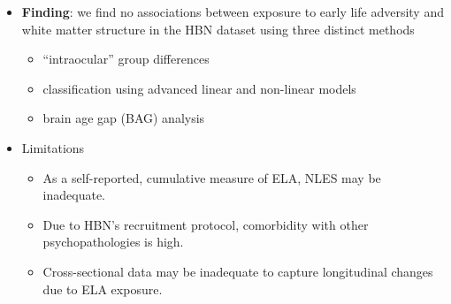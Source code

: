 \documentclass[a0paper,landscape,fontscale=0.385]{baposter}
\begin{document}
\begin{poster}
{\begin{multicols}{2}
\begin{itemize}[nosep, leftmargin=*]
    \item \textbf{Finding}: we find no associations between exposure to early
    life adversity and white matter structure in the HBN dataset using three
    distinct methods
    \begin{itemize}[nosep, leftmargin=*]
        \item ``intraocular'' group differences
        \item classification using advanced linear and non-linear models
        \item brain age gap (BAG) analysis
    \end{itemize}
    \item Limitations
    \begin{itemize}[nosep, leftmargin=*]
        \item As a self-reported, cumulative measure of ELA, NLES may be inadequate.
        \item Due to HBN's recruitment protocol, comorbidity with other
        psychopathologies is high.
        \item Cross-sectional data may be inadequate to capture longitudinal
        changes due to ELA exposure.
    \end{itemize}
\end{itemize}
\end{multicols}
}


\end{poster}
\end{document}
